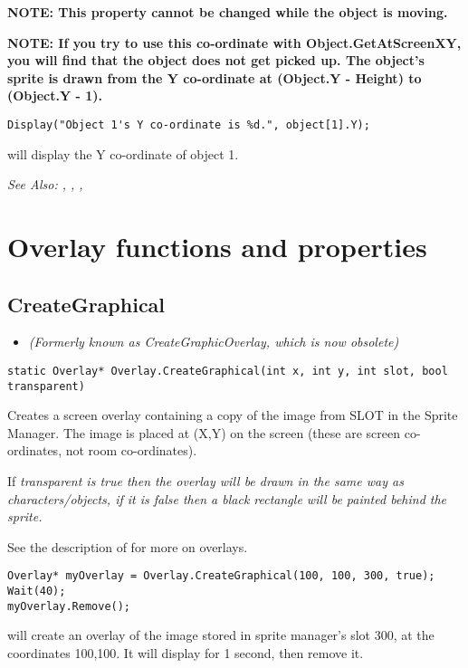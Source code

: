 \bf{NOTE:} This property cannot be changed while the object is moving.

\bf{NOTE:} If you try to use this co-ordinate with Object.GetAtScreenXY, you will find that
the object does not get picked up. The object's sprite is drawn from the Y co-ordinate
at (Object.Y - Height) to (Object.Y - 1).

\begin{verbatim}
Display("Object 1's Y co-ordinate is %d.", object[1].Y);
\end{verbatim}
will display the Y co-ordinate of object 1.

\it{See Also:} ,
, ,




\section{Overlay functions and properties}%


\subsection{CreateGraphical}\label{Overlay.CreateGraphical}%

\begin{itemize}
\item \it{(Formerly known as CreateGraphicOverlay, which is now obsolete)}
\end{itemize}

\begin{verbatim}
static Overlay* Overlay.CreateGraphical(int x, int y, int slot, bool transparent)
\end{verbatim}
Creates a screen overlay containing a copy of the image from SLOT in
the Sprite Manager. The image is placed at (X,Y) on the screen (these are
screen co-ordinates, not room co-ordinates).

If \it{transparent} is true then the overlay will be drawn in the
same way as characters/objects, if it is false
then a black rectangle will be painted behind the sprite.

See the description of  for more on overlays.

\begin{verbatim}
Overlay* myOverlay = Overlay.CreateGraphical(100, 100, 300, true);
Wait(40);
myOverlay.Remove();
\end{verbatim}
will create an overlay of the image stored in sprite manager's slot 300, at the
coordinates 100,100. It will display for 1 second, then remove it.

